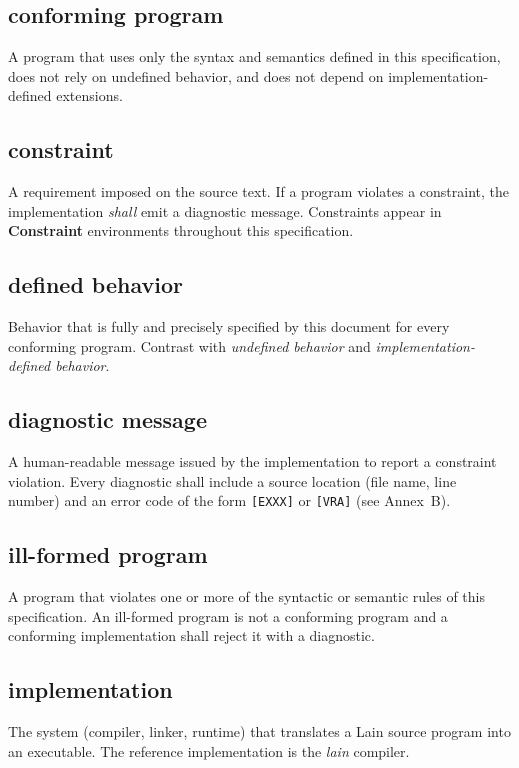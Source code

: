 \subsection*{conforming program}
A program that uses only the syntax and semantics defined in this
specification, does not rely on undefined behavior, and does not depend on
implementation-defined extensions.

\subsection*{constraint}
A requirement imposed on the source text.  If a program violates a
constraint, the implementation \textit{shall} emit a diagnostic message.
Constraints appear in \textbf{Constraint} environments throughout this
specification.

\subsection*{defined behavior}
Behavior that is fully and precisely specified by this document for every
conforming program.  Contrast with \textit{undefined behavior} and
\textit{implementation-defined behavior}.

\subsection*{diagnostic message}
A human-readable message issued by the implementation to report a
constraint violation.  Every diagnostic shall include a source location
(file name, line number) and an error code of the form \texttt{[EXXX]} or
\texttt{[VRA]} (see Annex~B).

\subsection*{ill-formed program}
A program that violates one or more of the syntactic or semantic rules of
this specification.  An ill-formed program is not a conforming program and
a conforming implementation shall reject it with a diagnostic.

\subsection*{implementation}
The system (compiler, linker, runtime) that translates a Lain source program
into an executable.  The reference implementation is the \textit{lain}
compiler.


